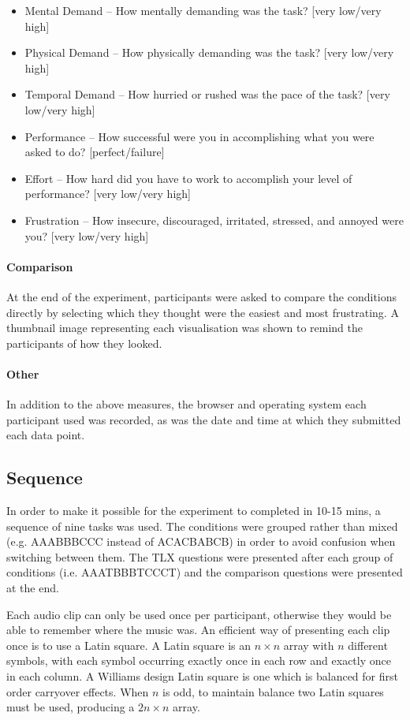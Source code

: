 {\singlespacing
\begin{itemize}
  \item Mental Demand -- How mentally demanding was the task? [very low/very
    high]
  \item Physical Demand -- How physically demanding was the task? [very
    low/very high]
  \item Temporal Demand -- How hurried or rushed was the pace of the task?
    [very low/very high]
  \item Performance -- How successful were you in accomplishing what you were
    asked to do? [perfect/failure]
  \item Effort -- How hard did you have to work to accomplish your level of
    performance? [very low/very high]
  \item Frustration -- How insecure, discouraged, irritated, stressed, and
    annoyed were you? [very low/very high]
\end{itemize}
}

\paragraph{Comparison}
At the end of the experiment, participants were asked to compare the conditions
directly by selecting which they thought were the easiest and most frustrating.
A thumbnail image representing each visualisation was shown to remind the
participants of how they looked.

\paragraph{Other}
In addition to the above measures, the browser and operating system each
participant used was recorded, as was the date and time at which they
submitted each data point.

\subsection{Sequence}\label{sec:studysequence}
In order to make it possible for the experiment to completed in 10-15 mins, a
sequence of nine tasks was used. The conditions were grouped rather than mixed
(e.g. AAABBBCCC instead of ACACBABCB) in order to avoid confusion when
switching between them. The TLX questions were presented after each group of
conditions (i.e. AAATBBBTCCCT) and the comparison questions were presented at
the end.

Each audio clip can only be used once per participant, otherwise they would be
able to remember where the music was. An efficient way of presenting each clip
once is to use a Latin square. A Latin square is an $n \times n$ array with $n$
different symbols, with each symbol occurring exactly once in each row and
exactly once in each column. A Williams design Latin square \citep{Williams1949}
is one which is balanced for first order carryover effects.  When $n$ is odd,
to maintain balance two Latin squares must be used, producing a $2n \times n$
array.

